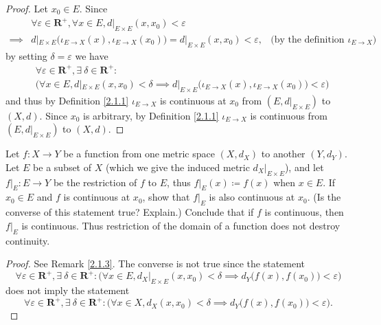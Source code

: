\begin{proof}
    Let \(x_0 \in E\).
    Since
    \begin{align*}
                 & \forall \varepsilon \in \mathbf{R}^+, \forall x \in E, d|_{E \times E}(x, x_0) < \varepsilon                                                                   \\
        \implies & d|_{E \times E}\big(\iota_{E \to X}(x), \iota_{E \to X}(x_0)\big) = d|_{E \times E}(x, x_0) < \varepsilon, & \text{(by the definition of \(\iota_{E \to X}\))}
    \end{align*}
    by setting \(\delta = \varepsilon\) we have
    \begin{align*}
         & \forall \varepsilon \in \mathbf{R}^+, \exists\ \delta \in \mathbf{R}^+ :                                                                             \\
         & \Big(\forall x \in E, d|_{E \times E}(x, x_0) < \delta \implies d|_{E \times E}\big(\iota_{E \to X}(x), \iota_{E \to X}(x_0)\big) < \varepsilon\Big)
    \end{align*}
    and thus by Definition \ref{2.1.1} \(\iota_{E \to X}\) is continuous at \(x_0\) from \((E, d|_{E \times E})\) to \((X, d)\).
    Since \(x_0\) is arbitrary, by Definition \ref{2.1.1} \(\iota_{E \to X}\) is continuous from \((E, d|_{E \times E})\) to \((X, d)\).
\end{proof}

\begin{exercise}\label{ex 2.1.6}
    Let \(f : X \to Y\) be a function from one metric space \((X, d_X)\) to another \((Y, d_Y)\).
    Let \(E\) be a subset of \(X\) (which we give the induced metric \(d_X|_{E \times E}\)), and let \(f|_E : E \to Y\) be the restriction of \(f\) to \(E\), thus \(f|_E(x) \coloneqq f(x)\) when \(x \in E\).
    If \(x_0 \in E\) and \(f\) is continuous at \(x_0\), show that \(f|_E\) is also continuous at \(x_0\).
    (Is the converse of this statement true? Explain.)
    Conclude that if \(f\) is continuous, then \(f|_E\) is continuous.
    Thus restriction of the domain of a function does not destroy continuity.
\end{exercise}

\begin{proof}
    See Remark \ref{2.1.3}.
    The converse is not true since the statement
    \[
        \forall \varepsilon \in \mathbf{R}^+, \exists\ \delta \in \mathbf{R}^+ : \Big(\forall x \in E, d_X|_{E \times E}(x, x_0) < \delta \implies d_Y\big(f(x), f(x_0)\big) < \varepsilon\Big)
    \]
    does not imply the statement
    \[
        \forall \varepsilon \in \mathbf{R}^+, \exists\ \delta \in \mathbf{R}^+ : \Big(\forall x \in X, d_X(x, x_0) < \delta \implies d_Y\big(f(x), f(x_0)\big) < \varepsilon\Big).
    \]
\end{proof}

